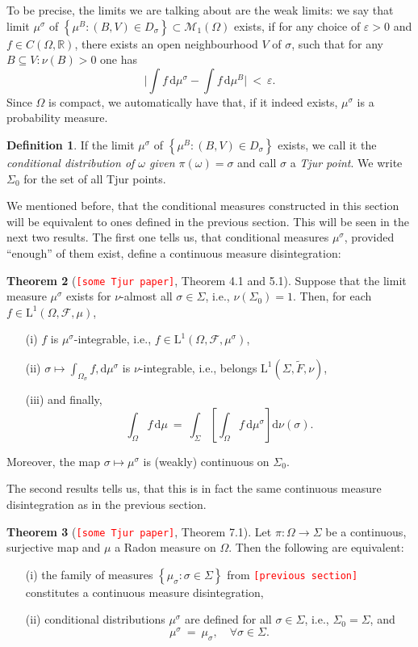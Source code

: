 \documentclass[12pt]{article}
\renewcommand{\d}{\mathrm{d}}
\newcommand{\F}{\mathcal{F}}
\newcommand{\M}{\mathcal{M}}
\newcommand{\R}{\mathbb{R}}
\newcommand{\set}[1]{\left\{#1\right\}}
\newcommand{\oglati}[1]{\left[#1\right]}
\newcommand{\ra}{\rightarrow}
\newcommand{\1}{\mathbbm{1}}
\newcommand{\5}{\vspace{0.5cm}}
\renewcommand{\tilde}{\widetilde}
\theoremstyle{definition}
\newtheorem{thm}{Theorem}[section]
\newtheorem{df}[thm]{Definition}
\begin{document}
To be precise, the limits we are talking about are the weak limits: we say that limit $\mu^\sigma$ of $\set{\mu^B:(B,V)\in D_\sigma}\subset\M_1(\Omega)$ exists, if for any choice of $\varepsilon>0$ and $f\in C(\Omega,\R)$, there exists an open neighbourhood $V$ of $\sigma$, such that for any $B\subseteq V:\nu(B)>0$ one has
$$\Big|\int f\,\d\mu^\sigma-\int f\,\d\mu^B\Big| ~<~ \varepsilon.$$
Since $\Omega$ is compact, we automatically have that, if it indeed exists, $\mu^\sigma$ is a probability measure.

\begin{df} 
If the limit $\mu^\sigma$ of $\set{\mu^B:(B,V)\in D_\sigma}$ exists, we call it the \textit{conditional distribution of $\omega$ given $\pi(\omega)=\sigma$} and call $\sigma$ a \textit{Tjur point}. We write $\Sigma_0$ for the set of all Tjur points.
\end{df}

We mentioned before, that the conditional measures constructed in this section will be equivalent to ones defined in the previous section. This will be seen in the next two results. The first one tells us, that conditional measures $\mu^\sigma$, provided ``enough'' of them exist, define a continuous measure disintegration:

\begin{thm}[\textcolor{red}{\texttt{[some Tjur paper]}}, Theorem 4.1 and 5.1]
Suppose that the limit measure $\mu^\sigma$ exists for $\nu$-almost all $\sigma\in\Sigma$, i.e., $\nu(\Sigma_0)=1$. Then, for each $f\in\mathrm{L}^1(\Omega,\F,\mu)$,
\begin{itemize}
	\item[(i)] $f$ is $\mu^\sigma$-integrable, i.e., $f\in\mathrm{L}^1(\Omega,\F,\mu^\sigma)$, 
	\item[(ii)] $\sigma\mapsto\int_{\Omega_\sigma}f,\d\mu^\sigma$ is $\nu$-integrable, i.e., belongs $\mathrm{L}^1(\Sigma,\tilde{F},\nu)$, 
	\item[(iii)] and finally,
	$$\int_\Omega f\,\d\mu ~=~ \int_\Sigma\!\oglati{\int_\Omega f\,\d\mu^\sigma}\!\d\nu(\sigma).$$
\end{itemize}
Moreover, the map $\sigma\mapsto\mu^\sigma$ is (weakly) continuous on $\Sigma_0$.
\end{thm}
The second results tells us, that this is in fact the same continuous measure disintegration as in the previous section.
\begin{thm}[\textcolor{red}{\texttt{[some Tjur paper]}}, Theorem 7.1]
Let $\pi:\Omega\ra\Sigma$ be a continuous, surjective map and $\mu$ a Radon measure on $\Omega$. Then the following are equivalent:
\begin{itemize}
	\item[(i)] the family of measures $\set{\mu_\sigma:\sigma\in\Sigma}$ from \textcolor{red}{\texttt{[previous section]}} constitutes a continuous measure disintegration,
	\item[(ii)] conditional distributions $\mu^\sigma$ are defined for all $\sigma\in\Sigma$, i.e., $\Sigma_0=\Sigma$, and
	$$\mu^\sigma ~=~ \mu_\sigma, \quad \forall \sigma\in\Sigma.$$
\end{itemize}
\end{thm}
\end{document}
